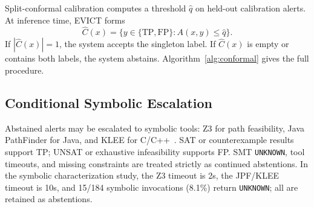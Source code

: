 Split-conformal calibration computes a threshold $\hat q$ on held-out calibration alerts. At inference time, EVICT forms
\begin{equation}
\hat C(x)=\{y\in\{\mathrm{TP},\mathrm{FP}\}: A(x,y)\le \hat q\}.
\end{equation}
If $|\hat C(x)|=1$, the system accepts the singleton label. If $\hat C(x)$ is empty or contains both labels, the system abstains. Algorithm~\ref{alg:conformal} gives the full procedure.

\subsection{Conditional Symbolic Escalation}

Abstained alerts may be escalated to symbolic tools: Z3 for path feasibility, Java PathFinder for Java, and KLEE for C/C++~\cite{jpf2003,spf2013,klee2008}. SAT or counterexample results support TP; UNSAT or exhaustive infeasibility supports FP. SMT \texttt{UNKNOWN}, tool timeouts, and missing constraints are treated strictly as continued abstentions. In the symbolic characterization study, the Z3 timeout is 2s, the JPF/KLEE timeout is 10s, and 15/184 symbolic invocations (8.1\%) return \texttt{UNKNOWN}; all are retained as abstentions.
